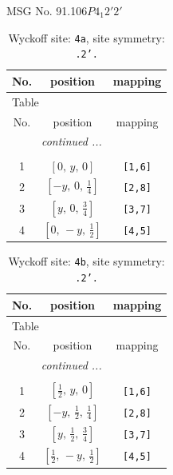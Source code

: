 \documentclass[fleqn,8pt]{jsarticle}
\begin{document}
\setcounter{MaxMatrixCols}{32}

\renewcommand{\tablename}{Table~}
\renewcommand{\figurename}{Figure~}
\begin{center}
\LARGE
MSG No. 91.106\quad$P4_{1}2'2'$
\end{center}
\renewcommand{\arraystretch}{1.2}
\begin{longtable}{ccc}
\caption{Wyckoff site: {\tt 4a}, site symmetry: {\tt .2'.}}
 \\
 \hline \hline
No. & position & mapping \\ \hline \endfirsthead

\multicolumn{2}{l}{\tablename\ \thetable{}} \\
 \hline \hline
No. & position & mapping \\ \hline \endhead

 \hline \hline
\multicolumn{2}{r}{\footnotesize\it continued ...} \\ \endfoot

 \hline \hline
\multicolumn{2}{r}{} \\ \endlastfoot

1 & $\left[ 0,\, y,\, 0 \right]$ & {\tt [1,6]} \\ \hline
2 & $\left[ - y,\, 0,\, \frac{1}{4} \right]$ & {\tt [2,8]} \\ \hline
3 & $\left[ y,\, 0,\, \frac{3}{4} \right]$ & {\tt [3,7]} \\ \hline
4 & $\left[ 0,\, - y,\, \frac{1}{2} \right]$ & {\tt [4,5]} \\
\end{longtable}
\renewcommand{\arraystretch}{1.2}
\begin{longtable}{ccc}
\caption{Wyckoff site: {\tt 4b}, site symmetry: {\tt .2'.}}
 \\
 \hline \hline
No. & position & mapping \\ \hline \endfirsthead

\multicolumn{2}{l}{\tablename\ \thetable{}} \\
 \hline \hline
No. & position & mapping \\ \hline \endhead

 \hline \hline
\multicolumn{2}{r}{\footnotesize\it continued ...} \\ \endfoot

 \hline \hline
\multicolumn{2}{r}{} \\ \endlastfoot

1 & $\left[ \frac{1}{2},\, y,\, 0 \right]$ & {\tt [1,6]} \\ \hline
2 & $\left[ - y,\, \frac{1}{2},\, \frac{1}{4} \right]$ & {\tt [2,8]} \\ \hline
3 & $\left[ y,\, \frac{1}{2},\, \frac{3}{4} \right]$ & {\tt [3,7]} \\ \hline
4 & $\left[ \frac{1}{2},\, - y,\, \frac{1}{2} \right]$ & {\tt [4,5]} \\
\end{longtable}
\end{document}
